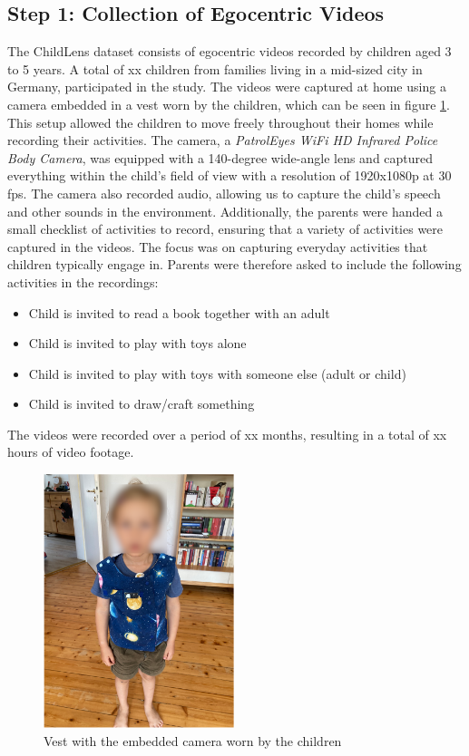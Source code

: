 \documentclass[
  man,floatsintext]{apa6}
\providecommand{\tightlist}{%
  \setlength{\itemsep}{0pt}\setlength{\parskip}{0pt}}
\begin{document}
\subsection{Step 1: Collection of Egocentric Videos}\label{step-1-collection-of-egocentric-videos}

The ChildLens dataset consists of egocentric videos recorded by children aged 3 to 5 years. A total of xx children from families living in a mid-sized city in Germany, participated in the study. The videos were captured at home using a camera embedded in a vest worn by the children, which can be seen in figure \ref{fig:camera-worn}. This setup allowed the children to move freely throughout their homes while recording their activities. The camera, a \emph{PatrolEyes WiFi HD Infrared Police Body Camera}, was equipped with a 140-degree wide-angle lens and captured everything within the child's field of view with a resolution of 1920x1080p at 30 fps. The camera also recorded audio, allowing us to capture the child's speech and other sounds in the environment. Additionally, the parents were handed a small checklist of activities to record, ensuring that a variety of activities were captured in the videos. The focus was on capturing everyday activities that children typically engage in. Parents were therefore asked to include the following activities in the recordings:

\begin{itemize}
\tightlist
\item
  Child is invited to read a book together with an adult
\item
  Child is invited to play with toys alone
\item
  Child is invited to play with toys with someone else (adult or child)
\item
  Child is invited to draw/craft something
\end{itemize}

The videos were recorded over a period of xx months, resulting in a total of xx hours of video footage.

\begin{figure}

{\centering \includegraphics[width=2.19in]{camera_worn} 

}

\caption{Vest with the embedded camera worn by the children}\label{fig:camera-worn}
\end{figure}
\end{document}
